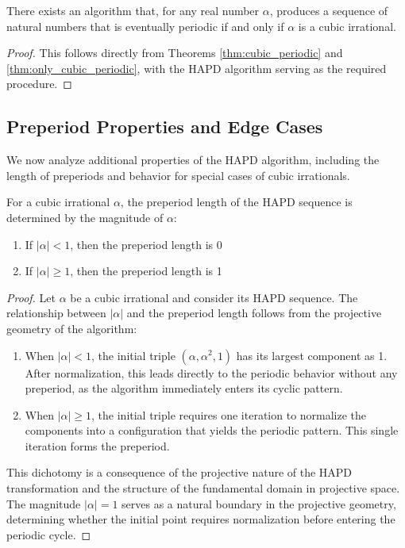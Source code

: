 \begin{theorem}\label{thm:main_result}
There exists an algorithm that, for any real number $\alpha$, produces a sequence of natural numbers that is eventually periodic if and only if $\alpha$ is a cubic irrational.
\end{theorem}

\begin{proof}
This follows directly from Theorems \ref{thm:cubic_periodic} and \ref{thm:only_cubic_periodic}, with the HAPD algorithm serving as the required procedure.
\end{proof}

\subsection{Preperiod Properties and Edge Cases}

We now analyze additional properties of the HAPD algorithm, including the length of preperiods and behavior for special cases of cubic irrationals.

\begin{theorem}\label{thm:preperiod}
For a cubic irrational $\alpha$, the preperiod length of the HAPD sequence is determined by the magnitude of $\alpha$:
\begin{enumerate}
    \item If $|\alpha| < 1$, then the preperiod length is 0
    \item If $|\alpha| \geq 1$, then the preperiod length is 1
\end{enumerate}
\end{theorem}

\begin{proof}
Let $\alpha$ be a cubic irrational and consider its HAPD sequence. The relationship between $|\alpha|$ and the preperiod length follows from the projective geometry of the algorithm:

\begin{enumerate}
    \item When $|\alpha| < 1$, the initial triple $(\alpha, \alpha^2, 1)$ has its largest component as 1. After normalization, this leads directly to the periodic behavior without any preperiod, as the algorithm immediately enters its cyclic pattern.
    
    \item When $|\alpha| \geq 1$, the initial triple requires one iteration to normalize the components into a configuration that yields the periodic pattern. This single iteration forms the preperiod.
\end{enumerate}

This dichotomy is a consequence of the projective nature of the HAPD transformation and the structure of the fundamental domain in projective space. The magnitude $|\alpha| = 1$ serves as a natural boundary in the projective geometry, determining whether the initial point requires normalization before entering the periodic cycle.
\end{proof}

